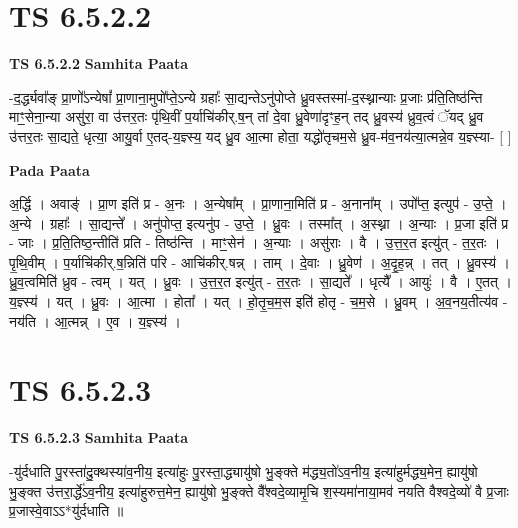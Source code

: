 \documentclass[17pt]{extarticle}
\begin{document}

\section{ TS 6.5.2.2 }

\textbf{TS 6.5.2.2 } \newline
\textbf{Samhita Paata} \newline

-द॒र्द्ध्यवा᳚ङ् प्रा॒णो᳚ऽन्येषां᳚ प्रा॒णाना॒मुपो᳚प्ते॒ऽन्ये ग्रहाः᳚ सा॒द्यन्तेऽनु॑पोप्ते ध्रु॒वस्तस्मा॑-द॒स्थ्नान्याः प्र॒जाः प्र॑ति॒तिष्ठ॑न्ति माꣳ॒॒सेना॒न्या असु॑रा॒ वा उ॑त्तर॒तः पृ॑थि॒वीं प॒र्याचि॑कीर्.ष॒न् तां दे॒वा ध्रु॒वेणा॑दृꣳह॒न् तद् ध्रु॒वस्य॑ ध्रुव॒त्वं ॅयद् ध्रु॒व उ॑त्तर॒तः सा॒द्यते॒ धृत्या॒ आयु॒र्वा ए॒तद्-य॒ज्ञ्स्य॒ यद् ध्रु॒व आ॒त्मा होता॒ यद्धो॑तृचम॒से ध्रु॒व-म॑व॒नय॑त्या॒त्मन्ने॒व य॒ज्ञ्स्या- [  ] \newline

\textbf{Pada Paata} \newline

अ॒र्द्धि । अवाङ्॑ । प्रा॒ण इति॑ प्र - अ॒नः । अ॒न्येषा᳚म् । प्रा॒णाना॒मिति॑ प्र - अ॒नाना᳚म् । उपो᳚प्त॒ इत्युप॑ - उ॒प्ते॒ । अ॒न्ये । ग्रहाः᳚ । सा॒द्यन्ते᳚ । अनु॑पोप्त॒ इत्यनु॑प - उ॒प्ते॒ । ध्रु॒वः । तस्मा᳚त् । अ॒स्थ्ना । अ॒न्याः । प्र॒जा इति॑ प्र - जाः । प्र॒ति॒तिष्ठ॒न्तीति॑ प्रति - तिष्ठ॑न्ति । माꣳ॒॒सेन॑ । अ॒न्याः । असु॑राः । वै । उ॒त्त॒र॒त इत्यु॑त् - त॒र॒तः । पृ॒थि॒वीम् । प॒र्याचि॑कीर्.ष॒न्निति॑ परि - आचि॑कीर्.षन्न् । ताम् । दे॒वाः । ध्रु॒वेण॑ । अ॒दृ॒ह॒न्न् । तत् । ध्रु॒वस्य॑ । ध्रु॒व॒त्वमिति॑ ध्रुव - त्वम् । यत् । ध्रु॒वः । उ॒त्त॒र॒त इत्यु॑त् - त॒र॒तः । सा॒द्यते᳚ । धृत्यै᳚ । आयुः॑ । वै । ए॒तत् । य॒ज्ञ्स्य॑ । यत् । ध्रु॒वः । आ॒त्मा । होता᳚ । यत् । हो॒तृ॒च॒म॒स इति॑ होतृ - च॒म॒से । ध्रु॒वम् । अ॒व॒नय॒तीत्य॑व - नय॑ति । आ॒त्मन्न् । ए॒व । य॒ज्ञ्स्य॑ ।  \newline





\section{ TS 6.5.2.3 }

\textbf{TS 6.5.2.3 } \newline
\textbf{Samhita Paata} \newline

-यु॑र्दधाति पु॒रस्ता॑दु॒क्थस्या॑व॒नीय॒ इत्या॑हुः पु॒रस्ता॒द्ध्यायु॑षो भु॒ङ्क्ते म॑द्ध्य॒तो॑ऽव॒नीय॒ इत्या॑हुर्मद्ध्य॒मेन॒ ह्यायु॑षो भु॒ङ्क्त उ॑त्तरा॒र्द्धे॑ऽव॒नीय॒ इत्या॑हुरुत्त॒मेन॒ ह्यायु॑षो भु॒ङ्क्ते वै᳚श्वदे॒व्यामृ॒चि श॒स्यमा॑नाया॒मव॑ नयति वैश्वदे॒व्यो॑ वै प्र॒जाः प्र॒जास्वे॒वाऽऽ*यु॑र्दधाति ॥ \newline
\end{document}
